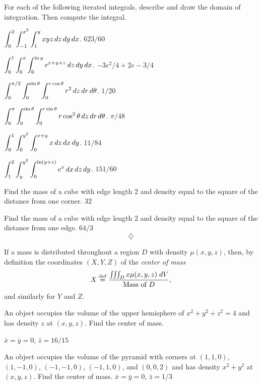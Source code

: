 \problem For each of the following iterated integrals, 
describe and draw the domain of integration.  Then compute the
integral.

\subprob$\displaystyle\int_{0}^{2}\int_{-1}^{x^2}\int_{1}^{y} 
xyz \,dz\,dy\,dx$.
\answer
$623/60$
\endanswer

\subprob$\displaystyle\int_{0}^{1}\int_{0}^{x}\int_{0}^{\ln y} 
e^{x+y+z}\,dz\,dy\,dx$.
\answer
$-3e^2/4+2e-3/4$
\endanswer

\subprob
$\displaystyle\int_{0}^{\pi/2}\int_{0}^{\sin\theta}\int_{0}^{r\cos\theta}
r^2\,dz\,dr\,d\theta$.
\answer
$1/20$
\endanswer

\subprob 
$\displaystyle\int_{0}^{\pi}\int_{0}^{\sin\theta}\int_{0}^{r\sin\theta}
r\cos^2\theta\,dz\,dr\,d\theta$.
\answer
$\pi/48$
\endanswer

\subprob$\displaystyle\int_{0}^{1}\int_{0}^{y^2}\int_{0}^{x+y} 
x\,dz\,dx\,dy$.
\answer
$11/84$
\endanswer

\subprob$\displaystyle\int_{1}^{2}\int_{y}^{y^2}\int_{0}^{\ln(y+z)} 
e^x\,dx\,dz\,dy$.
\answer
$151/60$
\endanswer


\problem Find the mass of a cube with edge length 2 and density equal 
to the square of the distance from one corner.
\answer
$32$
\endanswer

\problem Find the mass of a cube with edge length 2 and density equal 
to the square of the distance from one edge.
\answer
$64/3$
\endanswer
\[
\diamondsuit
\]

If a mass is distributed throughout a region $D$ with density
$\mu(x, y, z)$, then, by definition the coordinates $(X,Y,Z)$
of the \emph{center of mass} 
\[
X \stackrel{\rm def}{=} \frac{\iiint_D x\mu(x, y, z)\; dV}{\text{Mass of }D},
\]
and similarly for $Y$ and $Z$.

\problem An object occupies the volume of the upper hemisphere of  
$x^2+y^2+z^2=4$ and has density $z$ at $(x,y,z)$. Find the center of mass.

\answer
$\bar x=\bar y=0$, $\bar z=16/15$
\endanswer

\problem An object occupies the volume of the pyramid with corners at  
$(1,1,0)$, $(1,-1,0)$, $(-1,-1,0)$, $(-1,1,0)$, and $(0,0,2)$ and has
density $x^2+y^2$ at $(x,y,z)$. Find the center of mass.
\answer
$\bar x=\bar y=0$, $\bar z=1/3$
\endanswer

